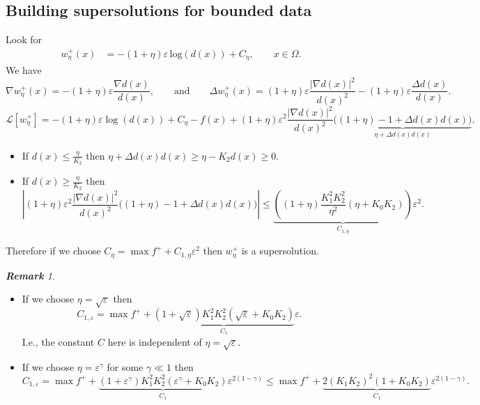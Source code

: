 \documentclass[10pt]{article}
\theoremstyle{plain}
\theoremstyle{remark}
\newtheorem{rem}{\bf{Remark}}
\begin{document}
\subsection{Building supersolutions for bounded data}
Look for 
\begin{equation*}
\begin{split}
    w^+_\eta(x) &= -(1+\eta)\varepsilon\, \mathrm{log}(d(x))+C_\eta, \qquad x\in \Omega.
\end{split}
\end{equation*}
We have
\begin{equation*}
    \nabla w^+_\eta(x) = -(1+\eta)\varepsilon\frac{\nabla d(x)}{d(x)}, \qquad \text{and}\qquad \Delta w^+_\eta(x) =(1+\eta)\varepsilon \frac{|\nabla d(x)|^2}{d(x)^2} - (1+\eta)\varepsilon \frac{\Delta d(x)}{d(x)}.
\end{equation*}
\begin{equation*}
    \mathcal{L}\left[w^+_\eta\right] = -(1+\eta)\varepsilon\log(d(x))+C_\eta - f(x) + (1+\eta)\varepsilon^2\frac{|\nabla d(x)|^2}{d(x)^2} \underbrace{\Big((1+\eta) - 1+  \Delta d(x) d(x) \Big)}_{\eta + \Delta d(x)d(x)}.
\end{equation*}
\begin{itemize}
    \item If $d(x) \leq \frac{\eta}{K_2}$ then $\eta + \Delta d(x)d(x) \geq \eta - K_2 d(x) \geq 0$.
    \item If $d(x)\geq \frac{\eta}{K_2}$ then
\begin{equation*}
    \left|(1+\eta)\varepsilon^2\frac{|\nabla d(x)|^2}{d(x)^2} \Big((1+\eta) - 1+  \Delta d(x) d(x) \Big)\right| \leq \underbrace{\left((1+\eta) \frac{K_1^2K_2^2}{\eta^2}(\eta+K_0K_2)\right)}_{C_{1,\eta}}\varepsilon^2.
\end{equation*}
\end{itemize}
Therefore if we choose $C_\eta = \max f^+ + C_{1,\eta} \varepsilon^2$ then $w^+_{\eta}$ is a supersolution.

\begin{rem} \quad
\begin{itemize}
    \item If we choose $\eta = \sqrt{\varepsilon}$ then 
\begin{equation*}
    C_{1,\varepsilon} = \max f^+ + \underbrace{(1+\sqrt{\varepsilon})K_1^2K_2^2(\sqrt{\varepsilon}+K_0K_2)}_{C_1}\varepsilon.
\end{equation*}
I.e., the constant $C$ here is independent of $\eta = \sqrt{\varepsilon}$.
    \item If we choose $\eta = \varepsilon^\gamma$ for some $\gamma \ll 1$ then
    \begin{equation*}
    C_{1,\varepsilon} = \max f^+ + \underbrace{(1+\varepsilon^\gamma)K_1^2K_2^2(\varepsilon^\gamma+K_0K_2)}_{C_1}\varepsilon^{2(1-\gamma)} \leq \max f^+ + \underbrace{2(K_1K_2)^2(1+K_0K_2)}_{C_1}\varepsilon^{2(1-\gamma)}.
\end{equation*}
\end{itemize}
\end{rem}
\end{document}
